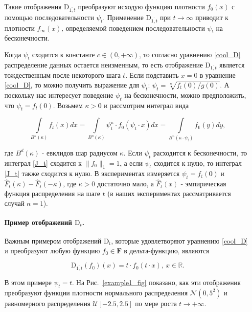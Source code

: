         Такие отображения $\text{D}_{\overline{1, t}}$ преобразуют исходую функцию плотности $f_0(x)$ с помощью последовательности $\psi_t$. Применение $\text{D}_{\overline{1, t}}$ при $t \to \infty$ приводит к плотности $f_\infty(x)$, определяемой поведением последовательности $\psi_t$ на бесконечности.
    
        Когда $\psi_t$ сходится к константе $c \in (0, +\infty)$, то согласно уравнению \eqref{cool_D} распределение данных остается неизменным, то есть отображение $\text{D}_{\overline{1, t}}$ является тождественным после некоторого шага $t$.
        Если подставить $x = 0$ в уравнение \eqref{cool_D}, то можно получить выражение для $\psi_t$: $\psi_t = \sqrt[n]{f_t(0) / g(0)}$. А поскольку нас интересует поведение $\psi_t$ на бесконечности, можно предположить, что $\psi_t = f_t(0)$.  Возьмем $\kappa > 0$ и рассмотрим интеграл вида 
    
        \begin{equation} \label{J_t}
            \int\limits_{B^n(\kappa)}f_t(x)dx = \int\limits_{B^n(\kappa)}\psi_t^n \cdot f_0(\psi_t \cdot x)dx = \int\limits_{B^n(\kappa \cdot \psi_t)} f_0(y)dy,
        \end{equation}
    
        где $B^d(\kappa)$ - евклидов шар радиусом $\kappa$. Если $\psi_t$ расходится к бесконечности, то интеграл \eqref{J_t} сходится к $\|f_0\|_1 = 1$, а если $\psi_t$ сходится к нулю, то интеграл \eqref{J_t} также сходится к нулю. В экспериментах измеряется $\psi_t = f_t(0)$ и $\hat{F}_t(\kappa) - \hat{F}_t(-\kappa)$, где $\kappa > 0$ достаточно мало, а $\hat{F}_t(x)$ - эмпирическая функция распределения на шаге $t$ (в наших экспериментах рассматривается случай $n=1$). 
    
        \paragraph{Пример отображений $\text{D}_t$.} Важным примером отображений $\text{D}_t$, которые удовлетворяют уравнению \eqref{cool_D} и преобразуют любую функцию $f_0 \in \textbf{F}$ в дельта-функцию, являются
    
        \begin{equation*}
            \text{D}_{\overline{1, t}}(f_0)(x) = t \cdot f_0(t \cdot x), ~x \in \mathbb{R}.
        \end{equation*}
        
        В этом примере $\psi_t = t$. На Рис.~\ref{example1_fig} показано, как эти отображения преобразуют функции плотности нормального распределения $\mathcal{N}(0, 5^2)$ и равномерного распределения $\mathcal{U}[-2.5, 2.5]$ по мере роста $t \to +\infty$.
    
